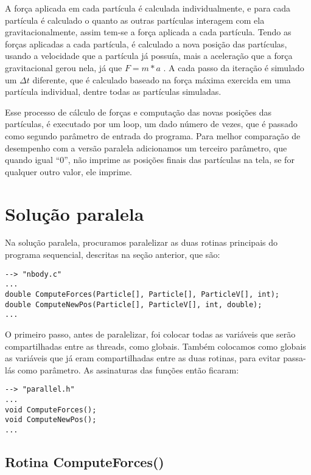 \documentclass[a4paper, 12pt]{article}
\begin{document}
A força aplicada em cada partícula é calculada individualmente, e para cada
partícula é calculado o quanto as outras partículas interagem com ela
gravitacionalmente, assim tem-se a força aplicada a cada partícula. Tendo as
forças aplicadas a cada partícula, é calculado a nova posição das partículas,
usando a velocidade que a partícula já possuía, mais a aceleração que a força
gravitacional gerou nela, já que $F = m*a$ . A cada passo da iteração é simulado
um $\Delta t$ diferente, que é calculado baseado na força máxima exercida em uma
partícula individual, dentre todas as partículas simuladas.

Esse processo de cálculo de forças e computação das novas posições das
partículas, é executado por um loop, um dado número de vezes, que é passado como
segundo parâmetro de entrada do programa. Para melhor comparação de desempenho
com a versão paralela adicionamos um terceiro parâmetro, que quando igual 
``0'', não imprime as posições finais das partículas na tela, se for qualquer
outro valor, ele imprime.


\section{Solução paralela}

Na solução paralela, procuramos paralelizar as duas rotinas principais do
programa sequencial, descritas na seção anterior, que são:
\begin{verbatim}
--> "nbody.c"
...
double ComputeForces(Particle[], Particle[], ParticleV[], int);
double ComputeNewPos(Particle[], ParticleV[], int, double);
...
\end{verbatim}

O primeiro passo, antes de paralelizar, foi colocar todas as variáveis que serão
compartilhadas entre as threads, como globais. Também colocamos como globais as
variáveis que já eram compartilhadas entre as duas rotinas, para evitar
passa-lás como parâmetro. As assinaturas das funções então ficaram:
\begin{verbatim}
--> "parallel.h"
...
void ComputeForces();
void ComputeNewPos();
...
\end{verbatim}


\subsection{Rotina ComputeForces()}
\end{document}
